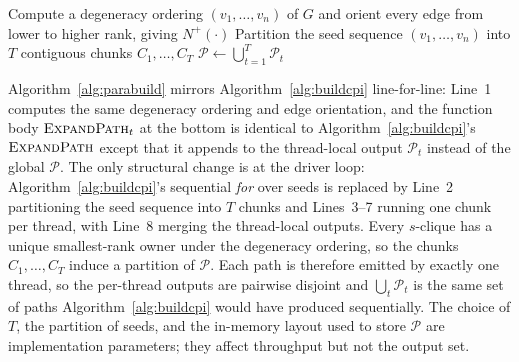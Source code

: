 \begin{algorithm}[t]
\algfontsize
\caption{\paraBuild{}: parallel \cpi{} construction.}
\label{alg:parabuild}

Compute a degeneracy ordering $(v_1,\ldots,v_n)$ of $G$ and orient every edge from lower to higher rank, giving $N^{+}(\cdot)$\;
Partition the seed sequence $(v_1,\ldots,v_n)$ into $T$ contiguous chunks $C_1,\ldots,C_T$\;
$\mathcal{P} \gets \bigcup_{t=1}^{T} \mathcal{P}_t$\;
\end{algorithm}

Algorithm~\ref{alg:parabuild} mirrors Algorithm~\ref{alg:buildcpi} line-for-line: Line~1 computes the same degeneracy ordering and edge orientation, and the function body $\textsc{ExpandPath}_t$ at the bottom is identical to Algorithm~\ref{alg:buildcpi}'s $\textsc{ExpandPath}$ except that it appends to the thread-local output $\mathcal{P}_t$ instead of the global $\mathcal{P}$.
%
The only structural change is at the driver loop: Algorithm~\ref{alg:buildcpi}'s sequential \emph{for} over seeds is replaced by Line~2 partitioning the seed sequence into $T$ chunks and Lines~3--7 running one chunk per thread, with Line~8 merging the thread-local outputs.
%
Every $s$-clique has a unique smallest-rank owner under the degeneracy ordering, so the chunks $C_1,\ldots,C_T$ induce a partition of $\mathcal{P}$.
%
Each path is therefore emitted by exactly one thread, so the per-thread outputs are pairwise disjoint and $\bigcup_t \mathcal{P}_t$ is the same set of paths Algorithm~\ref{alg:buildcpi} would have produced sequentially.
%
The choice of $T$, the partition of seeds, and the in-memory layout used to store $\mathcal{P}$ are implementation parameters; they affect throughput but not the output set.

